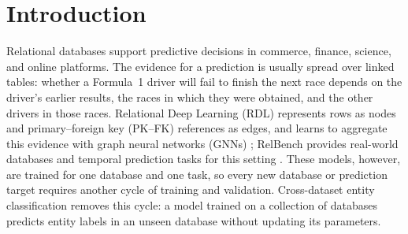 

\section{Introduction}
\label{sec:introduction}

Relational databases support predictive decisions in commerce, finance,
science, and online platforms. The evidence for a prediction is usually
spread over linked tables: whether a Formula~1 driver will fail to finish the
next race depends on the driver's earlier results, the races in which they
were obtained, and the other drivers in those races. Relational Deep Learning
(RDL) represents rows as nodes and primary--foreign key (PK--FK) references as
edges, and learns to aggregate this evidence with graph neural networks (GNNs)
\citep{fey2024rdl}; RelBench provides real-world databases and temporal
prediction tasks for this setting \citep{robinson2024relbench}. These models,
however, are trained for one database and one task, so every new database or
prediction target requires another cycle of training and validation.
Cross-dataset entity classification removes this cycle: a model trained on a
collection of databases predicts entity labels in an unseen database without
updating its parameters.

